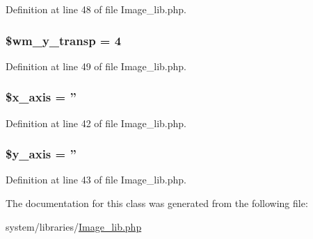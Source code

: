 Definition at line 48 of file Image\-\_\-lib.\-php.

\hypertarget{class_c_i___image__lib_aa9ab81b196739723a7c38d9431c9fa11}{
\subsubsection[{\$wm\-\_\-y\-\_\-transp}]{\setlength{\rightskip}{0pt plus 5cm}\$wm\-\_\-y\-\_\-transp = 4}}\label{class_c_i___image__lib_aa9ab81b196739723a7c38d9431c9fa11}


Definition at line 49 of file Image\-\_\-lib.\-php.

\hypertarget{class_c_i___image__lib_a128914b11765a500690f876962196ca6}{
\subsubsection[{\$x\-\_\-axis}]{\setlength{\rightskip}{0pt plus 5cm}\$x\-\_\-axis = ''}}\label{class_c_i___image__lib_a128914b11765a500690f876962196ca6}


Definition at line 42 of file Image\-\_\-lib.\-php.

\hypertarget{class_c_i___image__lib_ac60512307da37068c0821f7dc2488608}{
\subsubsection[{\$y\-\_\-axis}]{\setlength{\rightskip}{0pt plus 5cm}\$y\-\_\-axis = ''}}\label{class_c_i___image__lib_ac60512307da37068c0821f7dc2488608}


Definition at line 43 of file Image\-\_\-lib.\-php.



The documentation for this class was generated from the following file\-:\begin{DoxyCompactItemize}
\item 
system/libraries/\hyperlink{_image__lib_8php}{Image\-\_\-lib.\-php}\end{DoxyCompactItemize}
